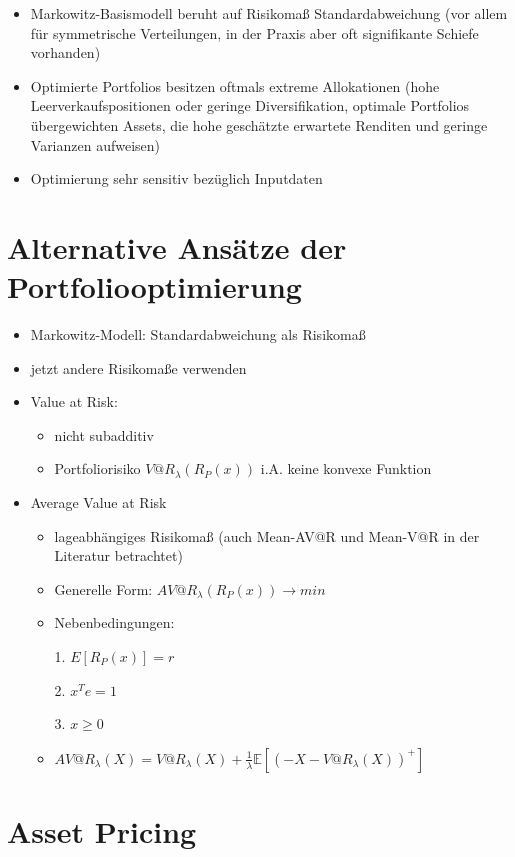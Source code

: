 \documentclass[12pt]{report}
\theoremstyle{dotless}
\theoremstyle{definition}
\begin{document}
\begin{itemize}
	\item Markowitz-Basismodell beruht auf Risikoma{\ss} Standardabweichung (vor allem f\"ur symmetrische Verteilungen, in der Praxis aber oft signifikante Schiefe vorhanden)
	\item Optimierte Portfolios besitzen oftmals extreme Allokationen (hohe Leerverkaufspositionen oder geringe Diversifikation, optimale Portfolios \"ubergewichten Assets, die hohe gesch\"atzte erwartete Renditen und geringe Varianzen aufweisen)
	\item Optimierung sehr sensitiv bez\"uglich Inputdaten
\end{itemize}

\section{Alternative Ans\"atze der Portfoliooptimierung}

\begin{itemize}
	\item Markowitz-Modell: Standardabweichung als Risikoma{\ss}
	\item jetzt andere Risikoma{\ss}e verwenden
	\item Value at Risk:
	\begin{itemize}
		\item nicht subadditiv
		\item Portfoliorisiko $V@R_{\lambda}(R_P(x))$ i.A. keine konvexe Funktion
	\end{itemize}
	\item Average Value at Risk
	\begin{itemize}
		\item lageabh\"angiges Risikoma{\ss} (auch Mean-AV@R und Mean-V@R in der Literatur betrachtet)
		\item Generelle Form: $AV@R_{\lambda}(R_P(x)) \rightarrow min$
		\item Nebenbedingungen:
		\item[1.] $E[R_P(x)] = r$
		\item[2.] $x^Te = 1$
		\item[3.] $x \geq 0$ 
		\item $AV@R_{\lambda}(X) = V@R_{\lambda}(X) + \frac{1}{\lambda} \mathbb{E}[(-X-V@R_{\lambda}(X))^{+}]$
	\end{itemize}
\end{itemize}

\section{Asset Pricing}
\end{document}
